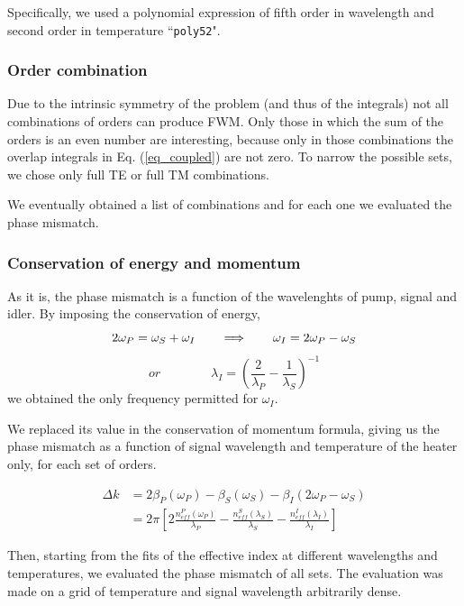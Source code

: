 \documentclass[12pt,a4paper,twoside]{article}
\begin{document}
Specifically, we used a polynomial expression of fifth order in wavelength and second order in temperature ``\texttt{poly52}".

\subsubsection{Order combination}

Due to the intrinsic symmetry of the problem (and thus of the integrals) not all combinations of orders can produce FWM.
Only those in which the sum of the orders is an even number are interesting, because only in those combinations the overlap integrals in Eq. (\ref{eq_coupled}) are not zero.
To narrow the possible sets, we chose only full TE or full TM  combinations.

We eventually obtained a list of combinations and for each one we evaluated the phase mismatch.

\subsubsection{Conservation of energy and momentum}
As it is, the phase mismatch is a function of the wavelenghts of pump, signal and idler.
By imposing the conservation of energy,
\begin{equation}
2\omega_P = \omega_S + \omega_I
\qquad \Longrightarrow \qquad
\omega_I = 2\omega_P - \omega_S \\
\end{equation}
$$or \qquad \qquad \lambda_I = \left( \frac{2}{\lambda_P} - \frac{1}{\lambda_S}\right)^{-1} $$
we obtained the only frequency permitted for $\omega_I$.

We replaced its value in the conservation of momentum formula, giving us the phase mismatch as a function of signal wavelength and temperature of the heater only, for each set of orders.

\begin{align*}
	\Delta k &= 2\beta_P(\omega_P)-\beta_S(\omega_S)-\beta_I(2\omega_P-\omega_S)\\
			 &= 2\pi\left[ 2\frac{n_{eff}^P(\omega_P)}{\lambda_P}
			 - \frac{n_{eff}^S(\lambda_S)}{\lambda_S}
			 - \frac{n_{eff}^I(\lambda_I)}{\lambda_I}\right]
\end{align*}

Then, starting from the fits of the effective index at different wavelengths and temperatures, we evaluated the phase mismatch of all sets.
The evaluation was made on a grid of temperature and signal wavelength arbitrarily dense.
\end{document}
